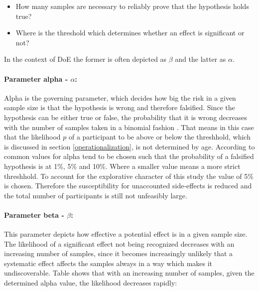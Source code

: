             \begin{itemize}
                \item How many samples are necessary to reliably prove that the hypothesis holds true?
                \item Where is the threshold which determines whether an effect is significant or not?
            \end{itemize}

            In the context of DoE the former is often depicted as $\beta$ and the latter as $\alpha$.

            \paragraph{Parameter alpha - $\alpha$:} Alpha is the governing parameter, which decides how big the risk in a given sample size is that the hypothesis is wrong and therefore falsified. Since the hypothesis can be either true or false, the probability that it is wrong decreases with the number of samples taken in a binomial fashion \cite[103]{Siebertz.2017}. That means in this case that the likelihood $p$ of a participant to be above or below the threshhold, which is discussed in section \ref*{operationalization}, is not determined by age. According to \cite[110]{Siebertz.2017} common values for alpha tend to be chosen such that the probability of a falsified hypothesis is at 1\%, 5\% and 10\%. Where a smaller value means a more strict threshhold. To account for the explorative character of this study the value of 5\% is chosen. Therefore the susceptibility for unaccounted side-effects is reduced and the total number of participants is still not unfeasibly large.

            \paragraph{Parameter beta - $\beta$:} This parameter depicts how effective a potential effect is in a given sample size. The likelihood of a significant effect not being recognized decreases with an increasing number of samples, since it becomes increasingly unlikely that a systematic effect affects the samples always in a way which makes it undiscoverable.
            Table  shows that with an increasing number of samples, given the determined alpha value, the likelihood decreases rapidly:

            \medskip
            \medskip

